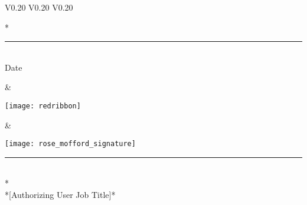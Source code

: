 \documentclass{article}
\begin{document}
\setlength{\tabcolsep}{12pt}
\begin{table}[h]
    \centering
    \begin{tabular} {V{0.20\paperwidth} V{0.20\paperwidth} V{0.20\paperwidth} }       
        \vspace{0pt}\parbox[b][1cm][b]{5cm}{\huge\selectfont {}* \\
        \rule{5cm}{0.4pt} \\
        \normalsize\selectfont \centering Date \\
        \phantom{Date}}                                                             &   
        \vspace{0pt}\parbox[b][1cm][c]{5cm}{\texttt{[image: redribbon]}} &   
        \vspace{0pt}\parbox[b][1cm][b]{5cm}{\texttt{[image: rose\_mofford\_signature]} \\
        \rule{5cm}{0.4pt} \\
        \normalsize\selectfont {}* \\
        *[Authorizing User Job Title]*}
    \end{tabular}
\end{table}
\end{document}
